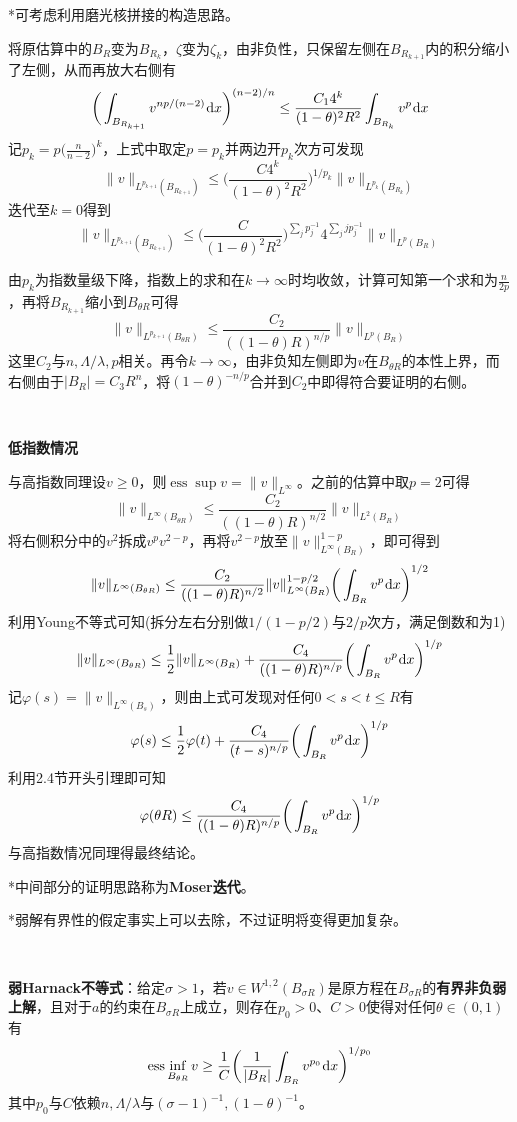 \documentclass[a4paper,UTF8,fontset=windows,AutoFakeBold]{ctexart}
\newcommand*{\dr}{\hspace{0.07em}\mathrm{d}}
\DeclareMathOperator*{\ess}{ess}
\begin{document}
{    *可考虑利用磨光核拼接的构造思路。

    将原估算中的$B_R$变为$B_{R_k}$，$\zeta$变为$\zeta_k$，由非负性，只保留左侧在$B_{R_{k+1}}$内的积分缩小了左侧，从而再放大右侧有
    $$\bigg(\int_{B_{R_{k+1}}}v^{np/(n-2)}\dr x\bigg)^{(n-2)/n}\le\frac{C_14^k}{(1-\theta)^2R^2}\int_{B_{R_k}}v^p\dr x$$
    记$p_k=p\big(\frac{n}{n-2}\big)^k$，上式中取定$p=p_k$并两边开$p_k$次方可发现
    $$\|v\|_{L^{p_{k+1}}(B_{R_{k+1}})}\le\bigg(\frac{C4^k}{(1-\theta)^2R^2}\bigg)^{1/p_k}\|v\|_{L^{p_k}(B_{R_k})}$$
    迭代至$k=0$得到
    $$\|v\|_{L^{p_{k+1}}(B_{R_{k+1}})}\le\bigg(\frac{C}{(1-\theta)^2R^2}\bigg)^{\sum_jp_j^{-1}}4^{\sum_jjp_j^{-1}}\|v\|_{L^p(B_R)}$$

    由$p_k$为指数量级下降，指数上的求和在$k\to\infty$时均收敛，计算可知第一个求和为$\frac{n}{2p}$，再将$B_{R_{k+1}}$缩小到$B_{\theta R}$可得
    $$\|v\|_{L^{p_{k+1}}(B_{\theta R})}\le\frac{C_2}{((1-\theta)R)^{n/p}}\|v\|_{L^p(B_R)}$$
    这里$C_2$与$n,\Lambda/\lambda,p$相关。再令$k\to\infty$，由非负知左侧即为$v$在$B_{\theta R}$的本性上界，而右侧由于$|B_R|=C_3R^n$，将$(1-\theta)^{-n/p}$合并到$C_2$中即得符合要证明的右侧。

    \

    \textbf{低指数情况}

    与高指数同理设$v\ge0$，则$\ess\sup v=\|v\|_{L^\infty}$。之前的估算中取$p=2$可得
    $$\|v\|_{L^\infty(B_{\theta R})}\le\frac{C_2}{((1-\theta)R)^{n/2}}\|v\|_{L^2(B_R)}$$
    将右侧积分中的$v^2$拆成$v^pv^{2-p}$，再将$v^{2-p}$放至$\|v\|_{L^\infty(B_R)}^{1-p}$，即可得到
    $$\|v\|_{L^\infty(B_{\theta R})}\le\frac{C_2}{((1-\theta)R)^{n/2}}\|v\|_{L^\infty(B_R)}^{1-p/2}\bigg(\int_{B_R}v^p\dr x\bigg)^{1/2}$$
    利用Young不等式可知(拆分左右分别做$1/(1-p/2)$与$2/p$次方，满足倒数和为1)
    $$\|v\|_{L^\infty(B_{\theta R})}\le\frac{1}{2}\|v\|_{L^\infty(B_R)}+\frac{C_4}{((1-\theta)R)^{n/p}}\bigg(\int_{B_R}v^p\dr x\bigg)^{1/p}$$
    记$\varphi(s)=\|v\|_{L^\infty(B_s)}$，则由上式可发现对任何$0<s<t\le R$有
    $$\varphi(s)\le\frac{1}{2}\varphi(t)+\frac{C_4}{(t-s)^{n/p}}\bigg(\int_{B_R}v^p\dr x\bigg)^{1/p}$$
    利用2.4节开头引理即可知
    $$\varphi(\theta R)\le\frac{C_4}{((1-\theta)R)^{n/p}}\bigg(\int_{B_R}v^p\dr x\bigg)^{1/p}$$
    与高指数情况同理得最终结论。
}

*中间部分的证明思路称为\textbf{Moser迭代}。

*弱解有界性的假定事实上可以去除，不过证明将变得更加复杂。

\

\textbf{弱Harnack不等式}：给定$\sigma>1$，若$v\in W^{1,2}(B_{\sigma R})$是原方程在$B_{\sigma R}$的\textbf{有界非负弱上解}，且对于$a$的约束在$B_{\sigma R}$上成立，则存在$p_0>0$、$C>0$使得对任何$\theta\in(0,1)$有
$$\ess\inf_{B_{\theta R}}v\ge\frac{1}{C}\bigg(\frac{1}{|B_R|}\int_{B_R}v^{p_0}\dr x\bigg)^{1/p_0}$$
其中$p_0$与$C$依赖$n,\Lambda/\lambda$与$(\sigma-1)^{-1},(1-\theta)^{-1}$。
\end{document}
